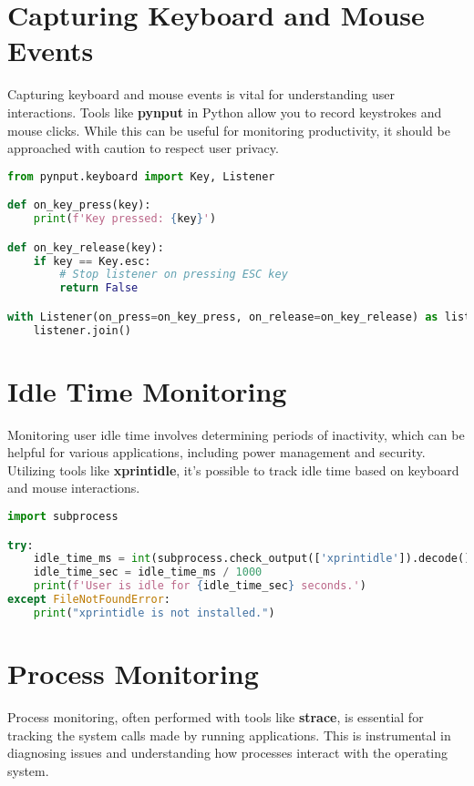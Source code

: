\documentclass{VUMIFPSmagistrinis}
\begin{document}
\section{Capturing Keyboard and Mouse Events}
Capturing keyboard and mouse events is vital for understanding user interactions. Tools like \textbf{pynput} in Python allow you to record keystrokes and mouse clicks. While this can be useful for monitoring productivity, it should be approached with caution to respect user privacy.

\begin{lstlisting}[language=Python]
from pynput.keyboard import Key, Listener

def on_key_press(key):
    print(f'Key pressed: {key}')

def on_key_release(key):
    if key == Key.esc:
        # Stop listener on pressing ESC key
        return False

with Listener(on_press=on_key_press, on_release=on_key_release) as listener:
    listener.join()
\end{lstlisting}

\section{Idle Time Monitoring}
Monitoring user idle time involves determining periods of inactivity, which can be helpful for various applications, including power management and security. Utilizing tools like \textbf{xprintidle}, it's possible to track idle time based on keyboard and mouse interactions.

\begin{lstlisting}[language=Python]
import subprocess

try:
    idle_time_ms = int(subprocess.check_output(['xprintidle']).decode())
    idle_time_sec = idle_time_ms / 1000
    print(f'User is idle for {idle_time_sec} seconds.')
except FileNotFoundError:
    print("xprintidle is not installed.")
\end{lstlisting}

\section{Process Monitoring}
Process monitoring, often performed with tools like \textbf{strace}, is essential for tracking the system calls made by running applications. This is instrumental in diagnosing issues and understanding how processes interact with the operating system.
\end{document}
